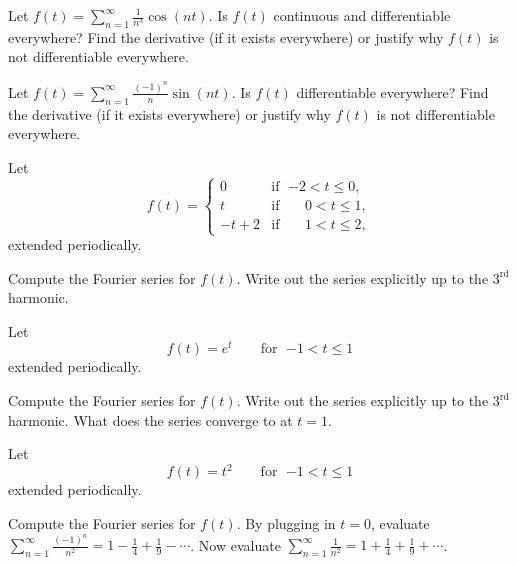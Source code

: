 \begin{exercise}
Let $f(t) = \sum_{n=1}^\infty \frac{1}{n^3} \cos (n t)$.  Is $f(t)$
continuous and differentiable everywhere?  Find the derivative (if it exists
everywhere)
or justify why $f(t)$ is not differentiable everywhere.
\end{exercise}

\begin{exercise}
Let $f(t) = \sum_{n=1}^\infty \frac{{(-1)}^n}{n} \sin (n t)$.  Is $f(t)$
differentiable everywhere?  Find the derivative (if it exists everywhere) or
justify why $f(t)$ is not differentiable everywhere.
\end{exercise}

\begin{exercise}
Let
\begin{equation*}
f(t) =
\begin{cases}
0 & \text{if } \; {-2} < t \leq 0, \\
t & \text{if } \; \phantom{-}0 < t \leq 1, \\
-t+2 & \text{if } \; \phantom{-}1 < t \leq 2,
\end{cases}
\end{equation*}
extended periodically.
\begin{tasks}
\task Compute the Fourier series for $f(t)$.
\task Write out the series explicitly up to the $3^{\text{rd}}$ harmonic.
\end{tasks}
\end{exercise}

\begin{exercise}
Let
\begin{equation*}
f(t) = e^t \qquad \text{for } \; {-1} < t \leq 1
\end{equation*}
extended periodically.
\begin{tasks}
\task Compute the Fourier series for $f(t)$.
\task Write out the series explicitly up to the $3^{\text{rd}}$ harmonic.
\task What does the series converge to at $t=1$.
\end{tasks}
\end{exercise}

\begin{exercise}
Let
\begin{equation*}
f(t) = t^2 \qquad \text{for } \; {-1} < t \leq 1
\end{equation*}
extended periodically.
\begin{tasks}
\task Compute the Fourier series for $f(t)$.
\task By plugging in $t=0$,
evaluate $\displaystyle \sum_{n=1}^\infty \frac{{(-1)}^n}{n^2} = 1 - \frac{1}{4} +
\frac{1}{9} - \cdots$.
\task Now evaluate $\displaystyle \sum_{n=1}^\infty \frac{1}{n^2} = 1 + \frac{1}{4} +
\frac{1}{9} + \cdots$.
\end{tasks}
\end{exercise}

